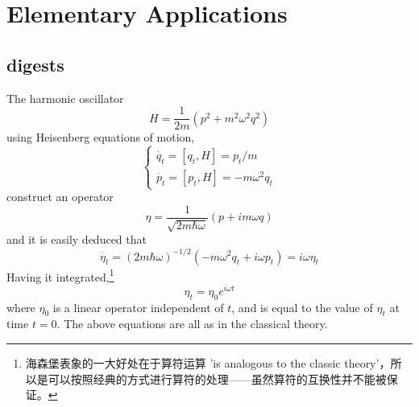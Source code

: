 
\section{Elementary Applications}

\subsection{digests}
{\Large The harmonic oscillator} 
\begin{equation}
H=\frac{1}{2m} (p^2 + m^2 \omega^2 q^2)
\end{equation}
using Heisenberg equations of motion,
\begin{equation}
\begin{cases}
\dot{q_t}=[q_t, H] = p_t / m \\
\dot{p_t} = [p_t, H] = - m \omega^2 q_t
\end{cases}
\end{equation}
construct an operator
\begin{equation}
\eta = \frac{1}{\sqrt{2m\hbar \omega}} (p+im\omega q)
\end{equation}
and it is easily deduced that
\begin{equation}
\dot{\eta_t} = (2m\hbar \omega)^{-1/2}(-m\omega^2 q_t + i\omega p_t) = i\omega \eta_t
\end{equation}
Having it integrated,\footnote{海森堡表象的一大好处在于算符运算 'is analogous to the classic theory'，所以是可以按照经典的方式进行算符的处理——虽然算符的互换性并不能被保证。}
\begin{equation}
\eta_t = \eta_0 e^{i\omega t}
\end{equation}
where $\eta_0$ is a linear operator independent of $t$, and is equal to the value of $\eta_t$ at time $t=0$. The above equations are all as in the classical theory.

